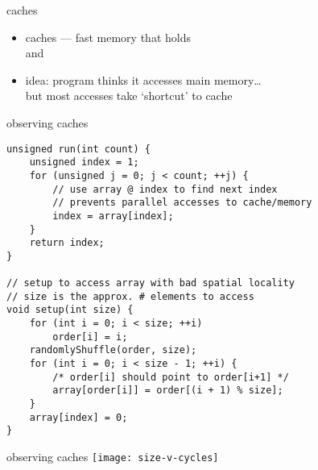 \begin{frame}{caches}
    \begin{itemize}
    \item caches --- fast memory that holds\\
         and \\
    \item idea: program thinks it accesses main memory\ldots \\
        but most accesses take `shortcut' to cache
    \end{itemize} 
\end{frame}

\begin{frame}[fragile,label=observeCaches]{observing caches}
\lstset{
    language=C++,style=smaller
}
\begin{lstlisting}
unsigned run(int count) {
    unsigned index = 1;
    for (unsigned j = 0; j < count; ++j) {
        // use array @ index to find next index
        // prevents parallel accesses to cache/memory
        index = array[index];
    }
    return index;
}

// setup to access array with bad spatial locality
// size is the approx. # elements to access
void setup(int size) {
    for (int i = 0; i < size; ++i)
        order[i] = i;
    randomlyShuffle(order, size);
    for (int i = 0; i < size - 1; ++i) {
        /* order[i] should point to order[i+1] */
        array[order[i]] = order[(i + 1) % size];
    }
    array[index] = 0;
}
\end{lstlisting}
\end{frame}

\begin{frame}{observing caches}
    \vspace{-1cm}
    \texttt{[image: size-v-cycles]}
\end{frame} 
